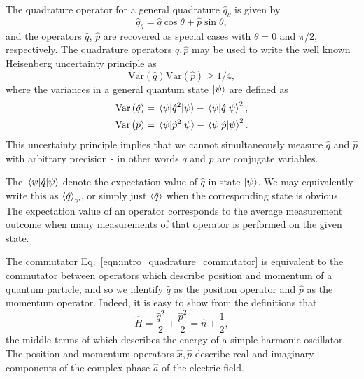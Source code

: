 \noindent The quadrature operator for a general quadrature $\hat{q}_\theta$ is given by
\begin{equation}
\hat{q}_\theta = \hat{q} \cos\theta  + \hat{p} \sin\theta ,
\end{equation}
and the operators $\hat{q}$, $\hat{p}$ are recovered as special cases with $\theta = 0$ and $\pi/2$, respectively. The quadrature operators $\hat{q}, \hat{p}$ may be used to write the well known Heisenberg uncertainty principle as
\begin{equation}
\text{Var}\left(\hat{q}\right)\text{Var}\left(\hat{p}\right) \ge 1/4, %
\end{equation} 
where the variances in a general quantum state $\ket{\psi}$ are defined as
\begin{align}
\text{Var}\left(\hat{q}\right) &= \mel{\psi}{\hat{q}^2}{\psi} - \mel{\psi}{\hat{q}}{\psi}^2, \notag \\
\text{Var}\left(\hat{p}\right) &= \mel{\psi}{\hat{p}^2}{\psi} - \mel{\psi}{\hat{p}}{\psi}^2.
\end{align}
This uncertainty principle implies that we cannot simultaneously measure $\hat{q}$ and $\hat{p}$ with arbitrary precision - in other words $q$ and $p$ are conjugate variables.

The $\mel{\psi}{\hat{q}}{\psi}$ denote the expectation value of $\hat{q}$ in state $\ket{\psi}$. We may equivalently write this as $\ev{\hat{q}}_\psi$, or simply just $\ev{\hat{q}}$ when the corresponding state is obvious. The expectation value of an operator corresponds to the average measurement outcome when many measurements of that operator is performed on the given state.

The commutator Eq.~\ref{eqn:intro_quadrature_commutator} is equivalent to the commutator between operators which describe position and momentum of a quantum particle, and so we identify $\hat{q}$ as the position operator and $\hat{p}$ as the momentum operator. Indeed, it is easy to show from the definitions that
\begin{equation}
\hat{H} = \frac{\hat{q}^2}{2} + \frac{\hat{p}^2}{2} = \hat{n} + \frac{1}{2} ,
\end{equation}
the middle terms of which describes the energy of a simple harmonic oscillator. The position and momentum operators $\hat{x}, \hat{p}$ describe real and imaginary components of the complex phase $\hat{a}$ of the electric field.





